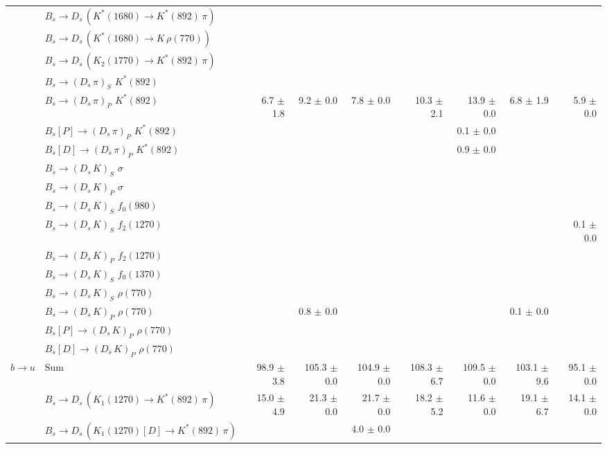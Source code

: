 \begin{tabular}{l l  r  r  r  r  r  r  r  }
 & $B_s \to D_s \, ( K^{*}(1680) \to K^{*}(892) \, \pi )$ &  &  &  &  &  &  &  \\ 
 & $B_s \to D_s \, ( K^{*}(1680) \to K \, \rho(770) )$ &  &  &  &  &  &  &  \\ 
 & $B_s \to D_s \, ( K_2(1770) \to K^{*}(892) \, \pi )$ &  &  &  &  &  &  &  \\ 
 & $B_s \to ( D_s \, \pi)_{S} \, \, K^{*}(892)$ &  &  &  &  &  &  &  \\ 
 & $B_s \to ( D_s \, \pi)_{P} \, \, K^{*}(892)$ & 6.7 $\pm$ 1.8 & 9.2 $\pm$ 0.0 & 7.8 $\pm$ 0.0 & 10.3 $\pm$ 2.1 & 13.9 $\pm$ 0.0 & 6.8 $\pm$ 1.9 & 5.9 $\pm$ 0.0 \\ 
 & $B_s[P] \to ( D_s \, \pi)_{P} \, \, K^{*}(892)$ &  &  &  &  & 0.1 $\pm$ 0.0 &  &  \\ 
 & $B_s[D] \to ( D_s \, \pi)_{P} \, \, K^{*}(892)$ &  &  &  &  & 0.9 $\pm$ 0.0 &  &  \\ 
 & $B_s \to ( D_s \, K)_{S} \, \, \sigma$ &  &  &  &  &  &  &  \\ 
 & $B_s \to ( D_s \, K)_{P} \, \, \sigma$ &  &  &  &  &  &  &  \\ 
 & $B_s \to ( D_s \, K)_{S} \, \, f_0(980)$ &  &  &  &  &  &  &  \\ 
 & $B_s \to ( D_s \, K)_{S} \, \, f_2(1270)$ &  &  &  &  &  &  & 0.1 $\pm$ 0.0 \\ 
 & $B_s \to ( D_s \, K)_{P} \, \, f_2(1270)$ &  &  &  &  &  &  &  \\ 
 & $B_s \to ( D_s \, K)_{S} \, \, f_0(1370)$ &  &  &  &  &  &  &  \\ 
 & $B_s \to ( D_s \, K)_{S} \, \, \rho(770)$ &  &  &  &  &  &  &  \\ 
 & $B_s \to ( D_s \, K)_{P} \, \, \rho(770)$ &  & 0.8 $\pm$ 0.0 &  &  &  & 0.1 $\pm$ 0.0 &  \\ 
 & $B_s[P] \to ( D_s \, K)_{P} \, \, \rho(770)$ &  &  &  &  &  &  &  \\ 
 & $B_s[D] \to ( D_s \, K)_{P} \, \, \rho(770)$ &  &  &  &  &  &  &  \\ 
\multirow{32}{*}{$b \to u$}  & $\text{Sum}$ & 98.9 $\pm$ 3.8 & 105.3 $\pm$ 0.0 & 104.9 $\pm$ 0.0 & 108.3 $\pm$ 6.7 & 109.5 $\pm$ 0.0 & 103.1 $\pm$ 9.6 & 95.1 $\pm$ 0.0 \\ 
\hline
 & $B_s \to D_s \, ( K_1(1270) \to K^{*}(892) \, \pi )$ & 15.0 $\pm$ 4.9 & 21.3 $\pm$ 0.0 & 21.7 $\pm$ 0.0 & 18.2 $\pm$ 5.2 & 11.6 $\pm$ 0.0 & 19.1 $\pm$ 6.7 & 14.1 $\pm$ 0.0 \\ 
 & $B_s \to D_s \, ( K_1(1270)[D] \to K^{*}(892) \, \pi )$ &  &  & 4.0 $\pm$ 0.0 &  &  &  &  \\ 

\end{tabular}
